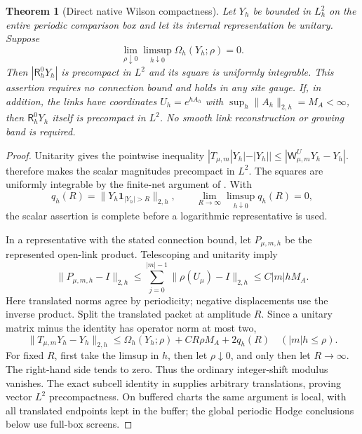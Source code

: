 \documentclass[11pt]{article}
\numberwithin{equation}{section}
\newtheorem{theorem}{Theorem}[section]
\theoremstyle{definition}
\theoremstyle{remark}
\newcommand{\norm}[1]{\lVert#1\rVert}
\begin{document}
\begin{theorem}[Direct native Wilson compactness]
\label{thm:native-Wilson-compactness}
Let $Y_h$ be bounded in $L_h^2$ on the entire periodic comparison box and
let its internal representation be unitary.  Suppose
\begin{equation}
 \lim_{\rho\downarrow0}\limsup_{h\downarrow0}
       \Omega_h(Y_h;\rho)=0.
 \label{eq:native-Wilson-compactness}
\end{equation}
Then $|\mathsf R_h^0Y_h|$ is precompact in $L^2$ and its square is uniformly
integrable.  This assertion requires no connection bound and holds in any
site gauge.  If, in addition, the links have coordinates $U_h=e^{hA_h}$
with $\sup_h\norm{A_h}_{2,h}=M_A<\infty$, then
$\mathsf R_h^0Y_h$ itself is precompact in $L^2$.  No smooth link
reconstruction or growing band is required.
\end{theorem}
\begin{proof}
Unitarity gives the pointwise inequality
$|T_{\mu,m}|Y_h|-|Y_h||\le|\mathsf W^U_{\mu,m}Y_h-Y_h|$.
 therefore makes the scalar magnitudes
precompact in $L^2$.  The squares are uniformly integrable by the finite-net
argument of .  With
\[
 q_h(R)=\norm{Y_h\mathbf1_{|Y_h|>R}}_{2,h},
 \qquad \lim_{R\to\infty}\limsup_{h\downarrow0}q_h(R)=0,
\]
the scalar assertion is complete before a logarithmic representative is used.

In a representative with the stated connection bound, let $P_{\mu,m,h}$
be the represented open-link product.  Telescoping and unitarity imply
\[
 \norm{P_{\mu,m,h}-I}_{2,h}
 \le\sum_{j=0}^{|m|-1}\norm{\rho(U_\mu)-I}_{2,h}
 \le C|m|hM_A.
\]
Here translated norms agree by periodicity; negative displacements use the
inverse product.  Split the translated packet at amplitude $R$.  Since
a unitary matrix minus the identity has operator norm at most two,
\begin{equation}
 \norm{T_{\mu,m}Y_h-Y_h}_{2,h}
 \le\Omega_h(Y_h;\rho)+CR\rho M_A+2q_h(R)
 \quad (|m|h\le\rho).
 \label{eq:native-Wilson-ordinary-modulus}
\end{equation}
For fixed $R$, first take the limsup in $h$, then let $\rho\downarrow0$,
and only then let $R\to\infty$.  The right-hand side tends to zero.
Thus the ordinary integer-shift modulus vanishes.  The exact subcell
identity in  supplies arbitrary translations,
proving vector $L^2$ precompactness.  On buffered charts the same argument
is local, with all translated endpoints kept in the buffer; the global
periodic Hodge conclusions below use full-box screens.
\end{proof}
\end{document}
